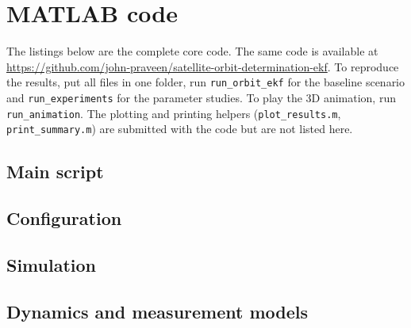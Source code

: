\documentclass[11pt,a4paper]{article}
\begin{document}
\appendix
\clearpage
\section{MATLAB code}
The listings below are the complete core code. The same code is available at \url{https://github.com/john-praveen/satellite-orbit-determination-ekf}. To reproduce the results, put all files in one folder, run \texttt{run\_orbit\_ekf} for the baseline scenario and \texttt{run\_experiments} for the parameter studies. To play the 3D animation, run \texttt{run\_animation}. The plotting and printing helpers (\texttt{plot\_results.m}, \texttt{print\_summary.m}) are submitted with the code but are not listed here.

\subsection{Main script}


\subsection{Configuration}


\subsection{Simulation}






\subsection{Dynamics and measurement models}



\end{document}
